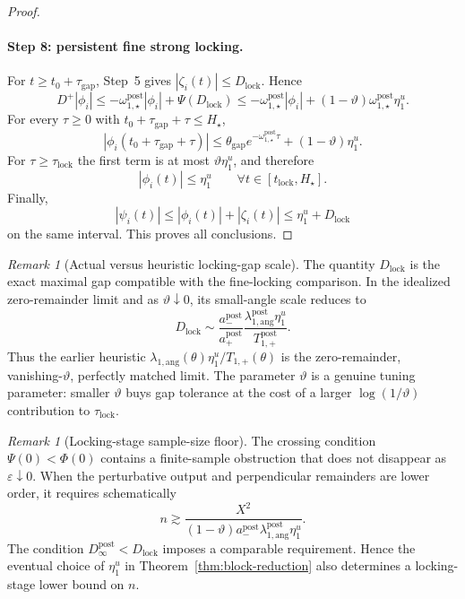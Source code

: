 \documentclass{article} %
\theoremstyle{plain}
\theoremstyle{definition}
\theoremstyle{remark}
\newtheorem{remark}[theorem]{Remark}
\begin{document}
\begin{proof}
\paragraph{Step 8: persistent fine strong locking.}
For $t\ge t_0+\tau_{\mathrm{gap}}$, Step~5 gives
$|\zeta_i(t)|\le D_{\mathrm{lock}}$.  Hence
\[
D^+|\phi_i|
\le
-\omega_{1,\star}^{\mathrm{post}}|\phi_i|
+
\Psi(D_{\mathrm{lock}})
\le
-\omega_{1,\star}^{\mathrm{post}}|\phi_i|
+
(1-\vartheta)\omega_{1,\star}^{\mathrm{post}}\eta_1^u.
\]
For every $\tau\ge0$ with
$t_0+\tau_{\mathrm{gap}}+\tau\le H_\star$,
\[
|\phi_i(t_0+\tau_{\mathrm{gap}}+\tau)|
\le
\theta_{\mathrm{gap}}e^{-\omega_{1,\star}^{\mathrm{post}}\tau}
+
(1-\vartheta)\eta_1^u.
\]
For $\tau\ge\tau_{\mathrm{lock}}$ the first term is at most
$\vartheta\eta_1^u$, and therefore
\[
\boxed{
|\phi_i(t)|\le\eta_1^u
\qquad
\forall t\in[t_{\mathrm{lock}},H_\star].
}
\]
Finally,
\[
|\psi_i(t)|
\le
|\phi_i(t)|+|\zeta_i(t)|
\le
\eta_1^u+D_{\mathrm{lock}}
\]
on the same interval.  This proves all conclusions.
\end{proof}

\begin{remark}[Actual versus heuristic locking-gap scale]
\label{rem:actual-locking-gap}
The quantity $D_{\mathrm{lock}}$ is the exact maximal gap compatible with the
fine-locking comparison.  In the idealized zero-remainder limit and as
$\vartheta\downarrow0$, its small-angle scale reduces to
\[
D_{\mathrm{lock}}
\sim
\frac{a_-^{\mathrm{post}}}{a_+^{\mathrm{post}}}
\frac{\lambda_{1,\mathrm{ang}}^{\mathrm{post}}\eta_1^u}
{T_{1,+}^{\mathrm{post}}}.
\]
Thus the earlier heuristic
$\lambda_{1,\mathrm{ang}}(\theta)\eta_1^u/T_{1,+}(\theta)$ is the
zero-remainder, vanishing-$\vartheta$, perfectly matched limit.  The
parameter $\vartheta$ is a genuine tuning parameter: smaller $\vartheta$
buys gap tolerance at the cost of a larger $\log(1/\vartheta)$ contribution
to $\tau_{\mathrm{lock}}$.
\end{remark}

\begin{remark}[Locking-stage sample-size floor]
\label{rem:locking-sample-floor}
The crossing condition $\Psi(0)<\Phi(0)$ contains a finite-sample obstruction
that does not disappear as $\varepsilon\downarrow0$.  When the perturbative
output and perpendicular remainders are lower order, it requires
schematically
\[
\boxed{
n
\gtrsim
\frac{X^2}
{(1-\vartheta)a_-^{\mathrm{post}}
\lambda_{1,\mathrm{ang}}^{\mathrm{post}}\eta_1^u}.
}
\]
The condition $D_\infty^{\mathrm{post}}<D_{\mathrm{lock}}$ imposes a
comparable requirement.  Hence the eventual choice of $\eta_1^u$ in
Theorem~\ref{thm:block-reduction} also determines a locking-stage lower bound
on $n$.
\end{remark}
\end{document}
